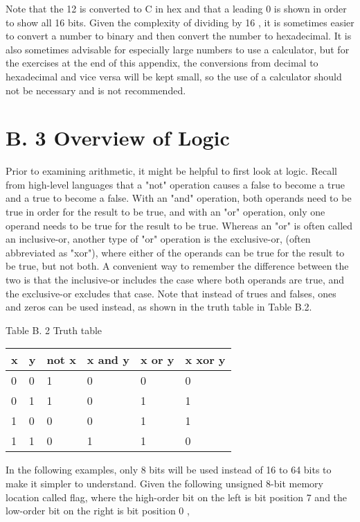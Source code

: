 \documentclass[10pt]{article}
\begin{document}
Note that the 12 is converted to C in hex and that a leading 0 is shown in order to show all 16 bits. Given the complexity of dividing by 16 , it is sometimes easier to convert a number to binary and then convert the number to hexadecimal. It is also sometimes advisable for especially large numbers to use a calculator, but for the exercises at the end of this appendix, the conversions from decimal to hexadecimal and vice versa will be kept small, so the use of a calculator should not be necessary and is not recommended.

\section*{B. 3 Overview of Logic}
Prior to examining arithmetic, it might be helpful to first look at logic. Recall from high-level languages that a "not" operation causes a false to become a true and a true to become a false. With an "and" operation, both operands need to be true in order for the result to be true, and with an "or" operation, only one operand needs to be true for the result to be true. Whereas an "or" is often called an inclusive-or, another type of "or" operation is the exclusive-or, (often abbreviated as "xor"), where either of the operands can be true for the result to be true, but not both. A convenient way to remember the difference between the two is that the inclusive-or includes the case where both operands are true, and the exclusive-or excludes that case. Note that instead of trues and falses, ones and zeros can be used instead, as shown in the truth table in Table B.2.

Table B. 2 Truth table

\begin{center}
\begin{tabular}{|l|l|l|l|l|l|}
\hline
x & y & not x & x and y & x or y & x xor y \\
\hline
0 & 0 & 1 & 0 & 0 & 0 \\
\hline
0 & 1 & 1 & 0 & 1 & 1 \\
\hline
1 & 0 & 0 & 0 & 1 & 1 \\
\hline
1 & 1 & 0 & 1 & 1 & 0 \\
\hline
\end{tabular}
\end{center}

In the following examples, only 8 bits will be used instead of 16 to 64 bits to make it simpler to understand. Given the following unsigned 8-bit memory location called flag, where the high-order bit on the left is bit position 7 and the low-order bit on the right is bit position 0 ,
\end{document}
